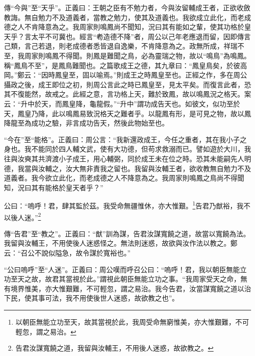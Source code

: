 {\noindent\zhuan{}\fzbyks 傳“今與”至“天乎”。正義曰：王朝之臣有不勉力者，今與汝留輔成王者，正欲收斂教誨。無自勉力不及道義者，當教之勉力，使其及道義也。我欲成立此化，而老成德之人不肯降意為之。我周家則鳴鳳尚不聞知，況曰其有能如之輩，使其功格於皇天乎？言太平不可冀也。經言“耇造德不降”者，周公以己年老應退而留，因即傳言己類，言己若退，則老成德者悉皆退自逸樂，不肯降意為之。政無所成，祥瑞不至，我周家則鳴鳳不得聞。則鳳是難聞之鳥，必為靈瑞之物，故以“鳴鳥”為鳴鳳。稱“鳳鳥不至”，是鳳鳥難聞也。之篇歌成王之德，其九章曰：“鳳皇鳥矣，於彼高岡。”鄭云：“因時鳳皇至，固以喻焉。”則成王之時鳳皇至也。正經之作，多在周公攝政之後，成王即位之初，則周公言此之時已鳳皇至，見太平矣。而復言此者，恐其不復能然，故戒之。此經之意，言功格上天，難於致鳳，故以鳴鳳況之格天。案云：“升中於天，而鳳皇降，龜龍假。”“升中”謂功成告天也。如彼文，似功至於天，鳳皇乃降，此以鳴鳳易致況格天之難者乎。以龍鳳有形，是可見之物，故以鳳降龍至為成功之驗，非言成功告天，然後此物始至也。 \par}

{\noindent\shu{}\fzkt “今在”至“能格”。正義曰：周公言：“我新還政成王，今任之重者，其在我小子之身也。我不能同於四人輔文武，使有大功德，但苟求救溺而已。譬如遊於大川，我往與汝奭其共濟渡小子成王，用心輔弼，同於成王未在位之時。恐其未能嗣先人明德，我當與汝輔之，汝大無非責我之留也。我留與汝輔王者，欲收教無自勉力不及道義者。我今欲立此化，而老成德之人不降意為之。我周家則鳴鳳之鳥尚不得聞知，況曰其有能格於皇天者乎？” \par}

公曰：“嗚呼！君，肆其監於茲。我受命無疆惟休，亦大惟艱。\footnote{以朝臣無能立功至天，故其當視於此，我周受命無窮惟美，亦大惟艱難，不可輕忽，謂之易治。}告君乃猷裕，我不以後人迷。”\footnote{告君汝謀寬饒之道，我留與汝輔王，不用後人迷惑，故欲教之。}


{\noindent\zhuan{}\fzbyks 傳“告君”至“教之”。正義曰：“猷”訓為謀，告君汝謀寬饒之道，故當以寬饒為法。我留與汝輔王，不用使後人迷惑怪之。無法則迷惑，故欲與汝作法以教之。鄭云：“召公不說似隘急，故令謀於寬裕也。” \par}

{\noindent\shu{}\fzkt “公曰嗚呼”至“人迷”。正義曰：周公嘆而呼召公曰：“嗚呼！君，我以朝臣無能立功至天之故，故君其當視於此。”謂視此朝臣無能立功之事。“我周家受天之命，無有境界惟美，亦大惟艱難，不可輕忽，謂之易治。我今告君，汝當謀寬饒之道以治下民，使其事可法，我不用使後世人迷惑，故欲教之也”。 \par}

